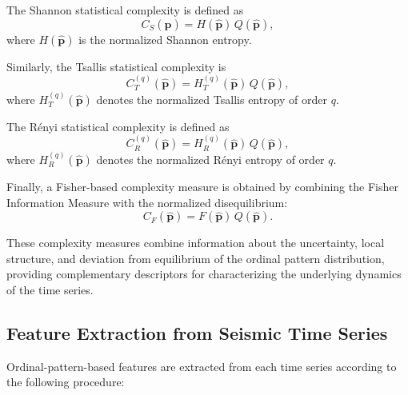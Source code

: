 \documentclass[12pt,a4paper]{article}
\begin{document}
The Shannon statistical complexity is defined as
\[
C_S(\widehat{\mathbf p})
=
H(\widehat{\mathbf p})
\,Q(\widehat{\mathbf p}),
\]
where \(H(\widehat{\mathbf p})\) is the normalized Shannon entropy.

Similarly, the Tsallis statistical complexity is
\[
C_T^{(q)}(\widehat{\mathbf p})
=
H_T^{(q)}(\widehat{\mathbf p})
\,Q(\widehat{\mathbf p}),
\]
where \(H_T^{(q)}(\widehat{\mathbf p})\) denotes the normalized Tsallis
entropy of order \(q\).

The Rényi statistical complexity is defined as
\[
C_R^{(q)}(\widehat{\mathbf p})
=
H_R^{(q)}(\widehat{\mathbf p})
\,Q(\widehat{\mathbf p}),
\]
where \(H_R^{(q)}(\widehat{\mathbf p})\) denotes the normalized Rényi
entropy of order \(q\).

Finally, a Fisher-based complexity measure is obtained by combining the Fisher Information Measure with the normalized disequilibrium:
\[
C_F(\widehat{\mathbf p})
=
F(\widehat{\mathbf p})
\,Q(\widehat{\mathbf p}).
\]

These complexity measures combine information about the uncertainty, local structure, and deviation from equilibrium of the ordinal pattern distribution, providing complementary descriptors for characterizing the underlying dynamics of the time series.


\subsection{Feature Extraction from Seismic Time Series}\label{feature_extraction}

Ordinal-pattern-based features are extracted from each time series according to the following procedure:
\end{document}
